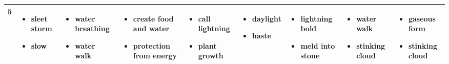 \begin{table}
\begin{tabular}{cp{3cm}p{3cm}p{3cm}p{3cm}p{3cm}p{3cm}p{3cm}p{3cm}}
	5 & 
	\begin{itemize}
		\item sleet storm
		\item slow
	\end{itemize}&
	\begin{itemize}
		\item water breathing
		\item water walk
	\end{itemize}& 
	\begin{itemize}
		\item create food and water
		\item protection from energy
	\end{itemize}&
	\begin{itemize}
		\item call lightning
		\item plant growth
	\end{itemize}&
	\begin{itemize}
		\item daylight
		\item haste
	\end{itemize}&
	\begin{itemize}
		\item lightning bold
		\item meld into stone
	\end{itemize}&
	\begin{itemize}
		\item water walk
		\item stinking cloud
	\end{itemize}&
	\begin{itemize}
		\item gaseous form
		\item stinking cloud
	\end{itemize}\\ \hline


\end{tabular}
\end{table}
